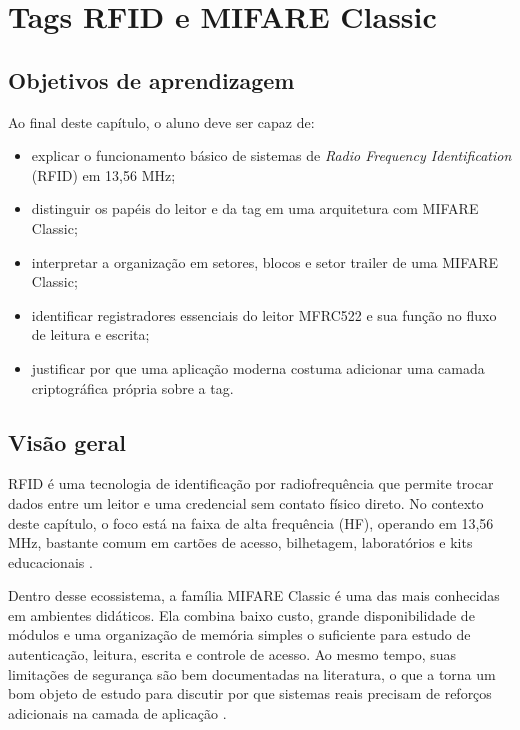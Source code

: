 \chapter{Tags RFID e MIFARE Classic}
\label{chap:rfid-mifare}

\section{Objetivos de aprendizagem}
Ao final deste capítulo, o aluno deve ser capaz de:
\begin{itemize}[leftmargin=*]
  \item explicar o funcionamento básico de sistemas de \textit{Radio Frequency Identification} (RFID) em 13,56 MHz;
  \item distinguir os papéis do leitor e da tag em uma arquitetura com MIFARE Classic;
  \item interpretar a organização em setores, blocos e setor trailer de uma MIFARE Classic;
  \item identificar registradores essenciais do leitor MFRC522 e sua função no fluxo de leitura e escrita;
  \item justificar por que uma aplicação moderna costuma adicionar uma camada criptográfica própria sobre a tag.
\end{itemize}
\section{Visão geral}
RFID é uma tecnologia de identificação por radiofrequência que permite trocar dados entre um leitor e uma credencial sem contato físico direto. No contexto deste capítulo, o foco está na faixa de alta frequência (HF), operando em 13,56 MHz, bastante comum em cartões de acesso, bilhetagem, laboratórios e kits educacionais \citep{finkenzeller_rfid,nxp_mifare_classic_ev1}.

Dentro desse ecossistema, a família MIFARE Classic é uma das mais conhecidas em ambientes didáticos. Ela combina baixo custo, grande disponibilidade de módulos e uma organização de memória simples o suficiente para estudo de autenticação, leitura, escrita e controle de acesso. Ao mesmo tempo, suas limitações de segurança são bem documentadas na literatura, o que a torna um bom objeto de estudo para discutir por que sistemas reais precisam de reforços adicionais na camada de aplicação \citep{garcia_dismantling_mifare,gans_practical_attack_mifare}.

